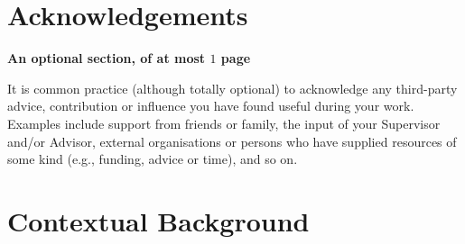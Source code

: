 \documentclass[ %
                    author={Ashwinder Khurana},
                supervisor={Prof Dave Cliff},
                    degree={MEng},
                     title={The Deeply Reinforced Trader},
                  subtitle={},
                      type={enterprise},
                      year={2020} ]{dissertation}
\begin{document}

\chapter*{Acknowledgements}

{\bf An optional section, of at most $1$ page}
\vspace{1cm} 

\noindent
It is common practice (although totally optional) to acknowledge any
third-party advice, contribution or influence you have found useful
during your work.  Examples include support from friends or family, 
the input of your Supervisor and/or Advisor, external organisations 
or persons who  have supplied resources of some kind (e.g., funding, 
advice or time), and so on.


%

\mainmatter


\chapter{Contextual Background}
\label{chap:context}

%
% 
\end{document}
